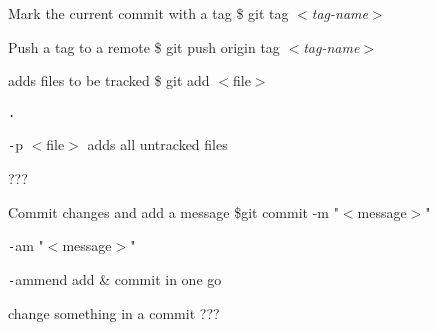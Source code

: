 \begin{tcolorbox}[ titleBox, title=BRANCHES \& TAGS]
    \begin{tcolorbox}[innerBox]
        Mark the current commit with a tag
      \tcblower
        \$ git tag $<$\textit{tag-name}$>$
    \end{tcolorbox}
        
    \begin{tcolorbox}[innerBox]
        Push a tag to a remote
      \tcblower
        \$ git push origin tag $<$\textit{tag-name}$>$
    \end{tcolorbox}
\end{tcolorbox}

\begin{tcolorbox}[ titleBox, title=LOCAL CHANGES]
    \begin{tcolorbox}[innerBox]
        adds files to be tracked
      \tcblower
        \$ git add $<$file$>$
    \end{tcolorbox}
    \begin{tcolorbox}[splitBox, lefthand ratio=0.30, fontupper = \small, fontlower = \small]
        \texttt . 
        \par\vspace{3mm}
        \texttt{-}\hspace{0.5mm}p $<$file$>$
      \tcblower
        adds all untracked files
        \par\vspace{3mm}
        ???
    \end{tcolorbox}

    \begin{tcolorbox}[innerBox]
        Commit changes and add a message
    \tcblower
        \$git commit -m "$<$message$>$"
    \end{tcolorbox}
    
    \begin{tcolorbox}[splitBox, lefthand ratio=0.42, fontupper = \small, fontlower = \small]
        \texttt{-}\hspace{0.5mm}am "$<$message$>$"
        \par\vspace{3mm}
        \texttt{-}ammend
      \tcblower
        add \& commit in one go
        \par\vspace{3mm}
        change something in a commit ???
    \end{tcolorbox}
\end{tcolorbox}


